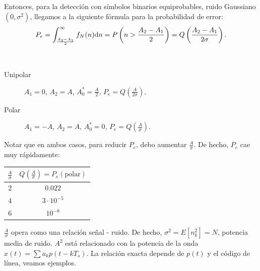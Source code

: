 Entonces, para la detección con símbolos binarios equiprobables,
ruido Gaussiano $(0,\sigma^2)$, llegamos a la siguiente fórmula
para la probabilidad de error:
\[P_e=\int_{\frac{A_2-A_1}{2}}^\infty f_N(n)\mathrm{d} n = P\left(n>\frac{A_2-A_1}{2}\right) = Q\left(\frac{A_2-A_1}{2\sigma}\right).\]

\begin{ejemplo}$\phantom{1}$
\begin{description}
    \item[Unipolar] $A_1=0$, $A_2=A$, $A_0^* = \frac{A}{2}$,
    $P_e=Q\left(\frac{A}{2\sigma}\right)$.
    \item[Polar] $A_1=-A$, $A_2=A$, $A_0^* = 0$, $P_e =
    Q\left(\frac{A}{\sigma}\right)$.
 \end{description}
Notar que en ambos casos, para reducir $P_e$, debo aumentar
$\frac{A}{\sigma}$. De hecho, $P_e$ cae muy rápidamente:
        \begin{center}
            \begin{tabular}{c|c}
                $\frac{A}{\sigma}$ & $Q\left(\frac{A}{\sigma}\right)=P_e(\text{polar})$\\
                \hline
                $2$ & $0.022$\\
                $4$ & $3\cdot 10^{-5}$\\
                $6$ & $10^{-8}$
            \end{tabular}
        \end{center}
\end{ejemplo}
%
$\frac{A}{\sigma}$ opera como una relación señal - ruido. De
hecho, $\sigma^2=E[n_k^2]=N$, potencia media de ruido. $A^2$ está
relacionado con la potencia de la onda $x(t) = \sum a_k
p(t-kT_s)$. La relación exacta depende de $p(t)$ y el código de
línea, veamos ejemplos.


